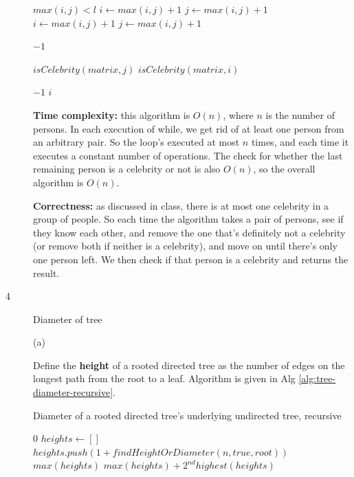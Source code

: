 \documentclass{article}
\begin{document}
\begin{description}
\begin{algorithm}[h]
\begin{algorithmic}[1]
      \While $max(i, j) < l$
          \State $i \gets max(i,j) + 1$
          \State $j \gets max(i,j) + 1$
        \Else
          \State $i \gets max(i,j) + 1$
          \State $j \gets max(i,j) + 1$
        \EndIf
      \EndWhile

        \State \Return $-1$
      \EndIf

        \State \Return $isCelebrity(matrix, j)$
      \Else
        \State \Return $isCelebrity(matrix, i)$
      \EndIf
    \EndFunction

          \State \Return $-1$
        \EndIf
      \EndFor
      \State \Return $i$
    \EndFunction
    \end{algorithmic}
  \end{algorithm}

  \textbf{Time complexity:} this algorithm is $O(n)$, where $n$ is the number of persons. In each execution of while, we get rid of at least one person from an arbitrary pair. So the loop's executed at most $n$ times, and each time it executes a constant number of operations. The check for whether the last remaining person is a celebrity or not is also $O(n)$, so the overall algorithm is $O(n)$.

  \textbf{Correctness:} as discussed in class, there is at most one celebrity in a group of people. So each time the algorithm takes a pair of persons, see if they know each other, and remove the one that's definitely not a celebrity (or remove both if neither is a celebrity), and move on until there's only one person left. We then check if that person is a celebrity and returns the result.

\item[4]{Diameter of tree}
  
  (a)

  Define the \textbf{height} of a rooted directed tree as the number of edges on the longest path from the root to a leaf. Algorithm is given in Alg \ref{alg:tree-diameter-recursive}.

  \begin{algorithm}[h]
  \caption{Diameter of a rooted directed tree's underlying undirected tree, recursive}
  \label{alg:tree-diameter-recursive}
    \begin{algorithmic}[1]
        \State \Return $0$
      \EndIf
      \State $heights \gets []$
        \State $heights.push(1 + findHeightOrDiameter(n, true, root))$
      \EndFor
        \State \Return $max(heights)$
      \Else
        \State \Return $max(heights) + 2^{nd}highest(heights)$
      \EndIf
    \EndFunction
    \end{algorithmic}
  \end{algorithm}


\end{description}
\end{document}

